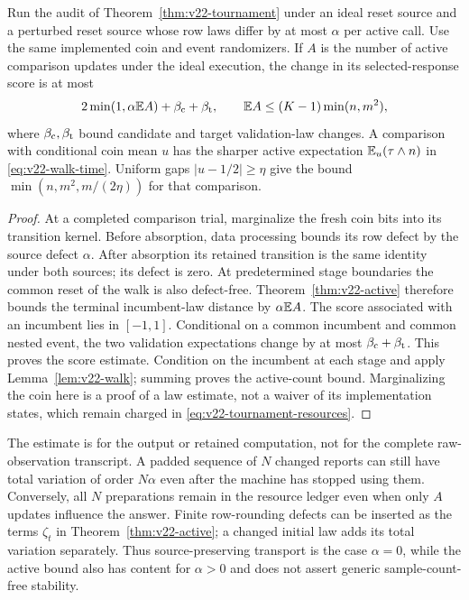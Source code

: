 \begin{corollary}
\label{cor:v22-active-training}
Run the audit of Theorem~\ref{thm:v22-tournament} under an ideal reset
source and a perturbed reset source whose row laws differ by at most
$\alpha$ per active call. Use the same implemented coin and event
randomizers. If $A$ is the number of active comparison updates under
the ideal execution, the change in its selected-response score is at
most
\begin{equation}\label{eq:v22-active-score}
 2\min(1,\alpha\mathbb E A)+\beta_{\rm c}+\beta_{\rm t},
 \qquad \mathbb E A\le(K-1)\min(n,m^2),
\end{equation}
where $\beta_{\rm c},\beta_{\rm t}$ bound candidate and target
validation-law changes. A comparison with conditional coin mean $u$
has the sharper active expectation $\mathbb E_u(\tau\wedge n)$ in
\eqref{eq:v22-walk-time}. Uniform gaps $|u-1/2|\ge\eta$ give the
bound $\min(n,m^2,m/(2\eta))$ for that comparison.
\end{corollary}
\begin{proof}
At a completed comparison trial, marginalize the fresh coin bits into
its transition kernel. Before absorption, data processing bounds its
row defect by the source defect $\alpha$. After absorption its retained
transition is the same identity under both sources; its defect is zero.
At predetermined stage boundaries the common reset of the walk is
also defect-free. Theorem~\ref{thm:v22-active} therefore bounds the
terminal incumbent-law distance by $\alpha\mathbb E A$. The score associated
with an incumbent lies in $[-1,1]$. Conditional on a common incumbent
and common nested event, the two validation expectations change by at
most $\beta_{\rm c}+\beta_{\rm t}$. This proves the score estimate.
Condition on the incumbent at each stage and apply
Lemma~\ref{lem:v22-walk}; summing proves the active-count bound.
Marginalizing the coin here is a proof of a law estimate, not a waiver
of its implementation states, which remain charged in
\eqref{eq:v22-tournament-resources}.
\end{proof}

The estimate is for the output or retained computation, not for the
complete raw-observation transcript. A padded sequence of $N$ changed
reports can still have total variation of order $N\alpha$ even after
the machine has stopped using them. Conversely, all $N$ preparations
remain in the resource ledger even when only $A$ updates influence the
answer. Finite row-rounding defects can be inserted as the terms
$\zeta_t$ in Theorem~\ref{thm:v22-active}; a changed initial law adds
its total variation separately. Thus source-preserving transport is
the case $\alpha=0$, while the active bound also has content for
$\alpha>0$ and does not assert generic sample-count-free stability.

